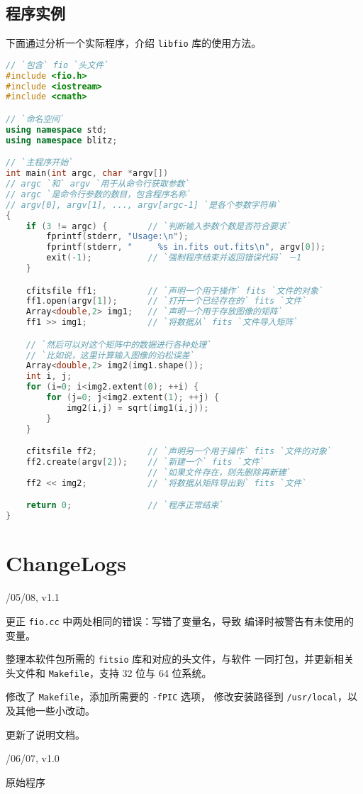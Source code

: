 \documentclass[a4paper,12pt]{article}
\begin{document}
\subsection{程序实例}
下面通过分析一个实际程序，介绍 \texttt{libfio} 库的使用方法。
\begin{lstlisting}[language={C++}]
// `包含` fio `头文件`
#include <fio.h>
#include <iostream>
#include <cmath>

// `命名空间`
using namespace std;
using namespace blitz;

// `主程序开始`
int main(int argc, char *argv[])
// argc `和` argv `用于从命令行获取参数`
// argc `是命令行参数的数目，包含程序名称`
// argv[0], argv[1], ..., argv[argc-1] `是各个参数字符串`
{
    if (3 != argc) {        // `判断输入参数个数是否符合要求`
        fprintf(stderr, "Usage:\n");
        fprintf(stderr, "     %s in.fits out.fits\n", argv[0]);
        exit(-1);           // `强制程序结束并返回错误代码` －1
    }

    cfitsfile ff1;          // `声明一个用于操作` fits `文件的对象`
    ff1.open(argv[1]);      // `打开一个已经存在的` fits `文件`
    Array<double,2> img1;   // `声明一个用于存放图像的矩阵`
    ff1 >> img1;            // `将数据从` fits `文件导入矩阵`

    // `然后可以对这个矩阵中的数据进行各种处理`
    // `比如说，这里计算输入图像的泊松误差`
    Array<double,2> img2(img1.shape());
    int i, j;
    for (i=0; i<img2.extent(0); ++i) {
        for (j=0; j<img2.extent(1); ++j) {
            img2(i,j) = sqrt(img1(i,j));
        }
    }

    cfitsfile ff2;          // `声明另一个用于操作` fits `文件的对象`
    ff2.create(argv[2]);    // `新建一个` fits `文件`
                            // `如果文件存在，则先删除再新建`
    ff2 << img2;            // `将数据从矩阵导出到` fits `文件`

    return 0;               // `程序正常结束`
}

\end{lstlisting}


\section{ChangeLogs}
/05/08, v1.1
\begin{compactitem}
  \item 更正 \texttt{fio.cc} 中两处相同的错误：写错了变量名，导致
      编译时被警告有未使用的变量。
  \item 整理本软件包所需的 \texttt{fitsio} 库和对应的头文件，与软件
      一同打包，并更新相关头文件和 \texttt{Makefile}，支持 32 位与 64 位系统。
  \item 修改了 \texttt{Makefile}，添加所需要的 \texttt{-fPIC} 选项，
      修改安装路径到 \texttt{/usr/local}，以及其他一些小改动。
  \item 更新了说明文档。
\end{compactitem}

/06/07, v1.0
\begin{compactitem}
  \item 原始程序
\end{compactitem}
\end{document}
